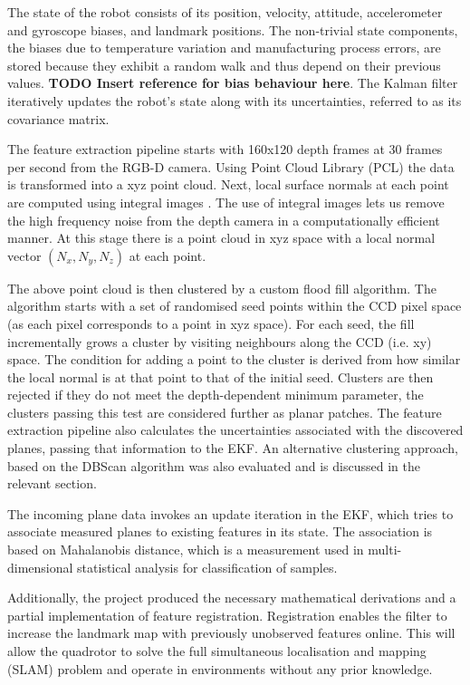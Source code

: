 \documentclass[]{article}
\begin{document}
{The state of the robot consists of its position, velocity, attitude, accelerometer and gyroscope biases, and landmark positions. The non-trivial state components, the biases due to temperature variation and manufacturing process errors, are stored because they exhibit a random walk and thus depend on their previous values. \textbf{TODO Insert reference for bias behaviour here}. The Kalman filter iteratively updates the robot's state along with its uncertainties, referred to as its covariance matrix.

The feature extraction pipeline starts with 160x120 depth frames at 30 frames per second from the RGB-D camera. Using Point Cloud Library (PCL) the data is transformed into a xyz point cloud. Next, local surface normals at each point are computed using integral images \cite{Holz2011}. The use of integral images lets us remove the high frequency noise from the depth camera in a computationally efficient manner. At this stage there is a point cloud in xyz space with a local normal vector $(N_x, N_y, N_z)$ at each point. 

The above point cloud is then clustered by a custom flood fill algorithm. The algorithm starts with a set of randomised seed points within the CCD pixel space (as each pixel corresponds to a point in xyz space). For each seed, the fill incrementally grows a cluster by visiting neighbours along the CCD (i.e. xy) space. The condition for adding a point to the cluster is derived from how similar the local normal is at that point to that of the initial seed. Clusters are then rejected if they do not meet the depth-dependent minimum parameter, the clusters passing this test are considered further as planar patches. The feature extraction pipeline also calculates the uncertainties associated with the discovered planes, passing that information to the EKF. An alternative clustering approach, based on the DBScan algorithm was also evaluated and is discussed in the relevant section.

The incoming plane data invokes an update iteration in the EKF, which tries to associate measured planes to existing features in its state. The association is based on Mahalanobis distance, which is a measurement used in multi-dimensional statistical analysis for classification of samples.

Additionally, the project produced the necessary mathematical derivations and a partial implementation of feature registration. Registration enables the filter to increase the landmark map with previously unobserved features online. This will allow the quadrotor to solve the full simultaneous localisation and mapping (SLAM) problem and operate in environments without any prior knowledge.



}
\end{document}
